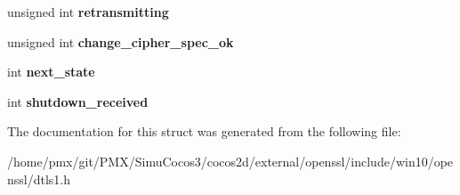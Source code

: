 \begin{DoxyCompactItemize}
unsigned int {\bfseries retransmitting}
\item 
\mbox{\label{structdtls1__state__st_a1d0bfd86d37d9058a404a119b2f68ee9}} 
unsigned int {\bfseries change\+\_\+cipher\+\_\+spec\+\_\+ok}
\item 
\mbox{\label{structdtls1__state__st_ab36e1f11a227d22300d6de44ea3ca7c7}} 
int {\bfseries next\+\_\+state}
\item 
\mbox{\label{structdtls1__state__st_adb9566c47686031f7236b44b25ff6356}} 
int {\bfseries shutdown\+\_\+received}
\end{DoxyCompactItemize}


The documentation for this struct was generated from the following file\+:\begin{DoxyCompactItemize}
\item 
/home/pmx/git/\+P\+M\+X/\+Simu\+Cocos3/cocos2d/external/openssl/include/win10/openssl/dtls1.\+h\end{DoxyCompactItemize}
